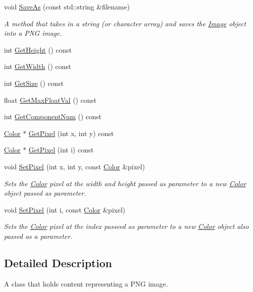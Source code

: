 \begin{DoxyCompactItemize}
void \hyperlink{classImage_afd027f3a969d6ff41c76a4ab2599d85d}{Save\+As} (const std\+::string \&filename)
\begin{DoxyCompactList}\small\item\em A method that takes in a string (or character array) and saves the \hyperlink{classImage}{Image} object into a P\+NG image. \end{DoxyCompactList}\item 
int \hyperlink{classImage_a631ead4be012caf49b3209d2ac401214}{Get\+Height} () const
\item 
int \hyperlink{classImage_a3da5012d5e314ce03b53d77276232186}{Get\+Width} () const
\item 
int \hyperlink{classImage_a8ee1acb5476bf0fecac66f5dfdd47a38}{Get\+Size} () const
\item 
float \hyperlink{classImage_a9efc74ed4a9af25d1eb01416ec47e78e}{Get\+Max\+Float\+Val} () const
\item 
int \hyperlink{classImage_aec11158c35b24ba60a835c877d791b36}{Get\+Component\+Num} () const
\item 
\hyperlink{classColor}{Color} $\ast$ \hyperlink{classImage_ae7136a83009449a0238f03efa1027c68}{Get\+Pixel} (int x, int y) const
\item 
\hyperlink{classColor}{Color} $\ast$ \hyperlink{classImage_aa54365cbbea7a483c275e8898b1ed119}{Get\+Pixel} (int i) const
\item 
void \hyperlink{classImage_a4b464d4f6348e8be2480688d9871ceac}{Set\+Pixel} (int x, int y, const \hyperlink{classColor}{Color} \&pixel)
\begin{DoxyCompactList}\small\item\em Sets the \hyperlink{classColor}{Color} pixel at the width and height passed as parameter to a new \hyperlink{classColor}{Color} object passed as parameter. \end{DoxyCompactList}\item 
void \hyperlink{classImage_a9774c194cd627ccb7dfe4165e7e5e996}{Set\+Pixel} (int i, const \hyperlink{classColor}{Color} \&pixel)
\begin{DoxyCompactList}\small\item\em Sets the \hyperlink{classColor}{Color} pixel at the index passeed as parameter to a new \hyperlink{classColor}{Color} object also passed as a parameter. \end{DoxyCompactList}\end{DoxyCompactItemize}


\subsection{Detailed Description}
A class that holds content representing a P\+NG image. 


